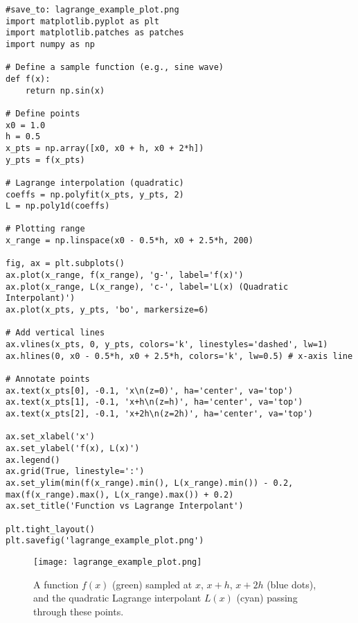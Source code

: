 \documentclass{article}
\begin{document}
\begin{verbatim}
#save_to: lagrange_example_plot.png
import matplotlib.pyplot as plt
import matplotlib.patches as patches
import numpy as np

# Define a sample function (e.g., sine wave)
def f(x):
    return np.sin(x)

# Define points
x0 = 1.0
h = 0.5
x_pts = np.array([x0, x0 + h, x0 + 2*h])
y_pts = f(x_pts)

# Lagrange interpolation (quadratic)
coeffs = np.polyfit(x_pts, y_pts, 2)
L = np.poly1d(coeffs)

# Plotting range
x_range = np.linspace(x0 - 0.5*h, x0 + 2.5*h, 200)

fig, ax = plt.subplots()
ax.plot(x_range, f(x_range), 'g-', label='f(x)')
ax.plot(x_range, L(x_range), 'c-', label='L(x) (Quadratic Interpolant)')
ax.plot(x_pts, y_pts, 'bo', markersize=6)

# Add vertical lines
ax.vlines(x_pts, 0, y_pts, colors='k', linestyles='dashed', lw=1)
ax.hlines(0, x0 - 0.5*h, x0 + 2.5*h, colors='k', lw=0.5) # x-axis line

# Annotate points
ax.text(x_pts[0], -0.1, 'x\n(z=0)', ha='center', va='top')
ax.text(x_pts[1], -0.1, 'x+h\n(z=h)', ha='center', va='top')
ax.text(x_pts[2], -0.1, 'x+2h\n(z=2h)', ha='center', va='top')

ax.set_xlabel('x')
ax.set_ylabel('f(x), L(x)')
ax.legend()
ax.grid(True, linestyle=':')
ax.set_ylim(min(f(x_range).min(), L(x_range).min()) - 0.2, max(f(x_range).max(), L(x_range).max()) + 0.2)
ax.set_title('Function vs Lagrange Interpolant')

plt.tight_layout()
plt.savefig('lagrange_example_plot.png')
\end{verbatim}

\begin{figure}[H]
\centering
\texttt{[image: lagrange\_example\_plot.png]}
\caption{A function $f(x)$ (green) sampled at $x$, $x+h$, $x+2h$ (blue dots), and the quadratic Lagrange interpolant $L(x)$ (cyan) passing through these points.}
\label{fig:lagrange_example_plot}
\end{figure}
\end{document}
